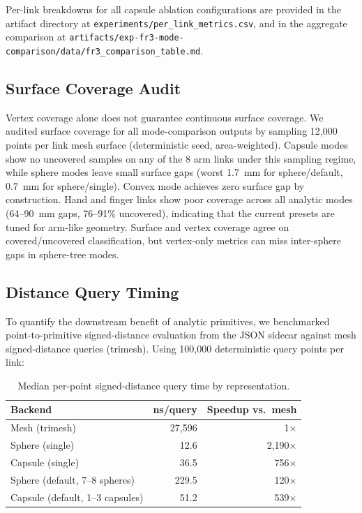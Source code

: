 Per-link breakdowns for all capsule ablation configurations are provided in the artifact directory at \texttt{experiments/per\_link\_metrics.csv}, and in the aggregate comparison at \texttt{artifacts/exp-fr3-mode-comparison/data/fr3\_comparison\_table.md}.

\subsection{Surface Coverage Audit}

Vertex coverage alone does not guarantee continuous surface coverage. We audited surface coverage for all mode-comparison outputs by sampling 12,000 points per link mesh surface (deterministic seed, area-weighted). Capsule modes show no uncovered samples on any of the 8 arm links under this sampling regime, while sphere modes leave small surface gaps (worst 1.7~mm for sphere/default, 0.7~mm for sphere/single). Convex mode achieves zero surface gap by construction. Hand and finger links show poor coverage across all analytic modes (64--90~mm gaps, 76--91\% uncovered), indicating that the current presets are tuned for arm-like geometry. Surface and vertex coverage agree on covered/uncovered classification, but vertex-only metrics can miss inter-sphere gaps in sphere-tree modes.

\subsection{Distance Query Timing}

To quantify the downstream benefit of analytic primitives, we benchmarked point-to-primitive signed-distance evaluation from the JSON sidecar against mesh signed-distance queries (trimesh). Using 100,000 deterministic query points per link:

\begin{table}[t]
\centering
\caption{Median per-point signed-distance query time by representation.}
\label{tab:distance_timing}
\begin{tabular}{@{}lrr@{}}
\toprule
Backend & ns/query & Speedup vs.\ mesh \\
\midrule
Mesh (trimesh) & 27,596 & 1$\times$ \\
Sphere (single) & 12.6 & 2,190$\times$ \\
Capsule (single) & 36.5 & 756$\times$ \\
Sphere (default, 7--8 spheres) & 229.5 & 120$\times$ \\
Capsule (default, 1--3 capsules) & 51.2 & 539$\times$ \\
\bottomrule
\end{tabular}
\end{table}

